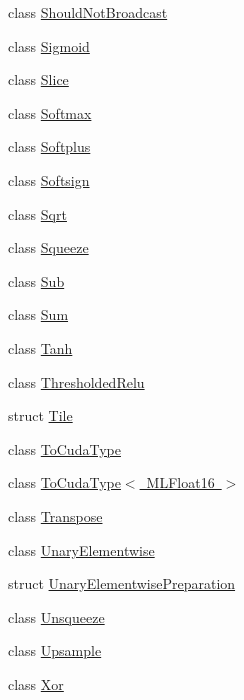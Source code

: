 \begin{DoxyCompactItemize}
class \mbox{\hyperlink{classonnxruntime_1_1cuda_1_1ShouldNotBroadcast}{Should\+Not\+Broadcast}}
\item 
class \mbox{\hyperlink{classonnxruntime_1_1cuda_1_1Sigmoid}{Sigmoid}}
\item 
class \mbox{\hyperlink{classonnxruntime_1_1cuda_1_1Slice}{Slice}}
\item 
class \mbox{\hyperlink{classonnxruntime_1_1cuda_1_1Softmax}{Softmax}}
\item 
class \mbox{\hyperlink{classonnxruntime_1_1cuda_1_1Softplus}{Softplus}}
\item 
class \mbox{\hyperlink{classonnxruntime_1_1cuda_1_1Softsign}{Softsign}}
\item 
class \mbox{\hyperlink{classonnxruntime_1_1cuda_1_1Sqrt}{Sqrt}}
\item 
class \mbox{\hyperlink{classonnxruntime_1_1cuda_1_1Squeeze}{Squeeze}}
\item 
class \mbox{\hyperlink{classonnxruntime_1_1cuda_1_1Sub}{Sub}}
\item 
class \mbox{\hyperlink{classonnxruntime_1_1cuda_1_1Sum}{Sum}}
\item 
class \mbox{\hyperlink{classonnxruntime_1_1cuda_1_1Tanh}{Tanh}}
\item 
class \mbox{\hyperlink{classonnxruntime_1_1cuda_1_1ThresholdedRelu}{Thresholded\+Relu}}
\item 
struct \mbox{\hyperlink{structonnxruntime_1_1cuda_1_1Tile}{Tile}}
\item 
class \mbox{\hyperlink{classonnxruntime_1_1cuda_1_1ToCudaType}{To\+Cuda\+Type}}
\item 
class \mbox{\hyperlink{classonnxruntime_1_1cuda_1_1ToCudaType_3_01MLFloat16_01_4}{To\+Cuda\+Type$<$ M\+L\+Float16 $>$}}
\item 
class \mbox{\hyperlink{classonnxruntime_1_1cuda_1_1Transpose}{Transpose}}
\item 
class \mbox{\hyperlink{classonnxruntime_1_1cuda_1_1UnaryElementwise}{Unary\+Elementwise}}
\item 
struct \mbox{\hyperlink{structonnxruntime_1_1cuda_1_1UnaryElementwisePreparation}{Unary\+Elementwise\+Preparation}}
\item 
class \mbox{\hyperlink{classonnxruntime_1_1cuda_1_1Unsqueeze}{Unsqueeze}}
\item 
class \mbox{\hyperlink{classonnxruntime_1_1cuda_1_1Upsample}{Upsample}}
\item 
class \mbox{\hyperlink{classonnxruntime_1_1cuda_1_1Xor}{Xor}}
\end{DoxyCompactItemize}
